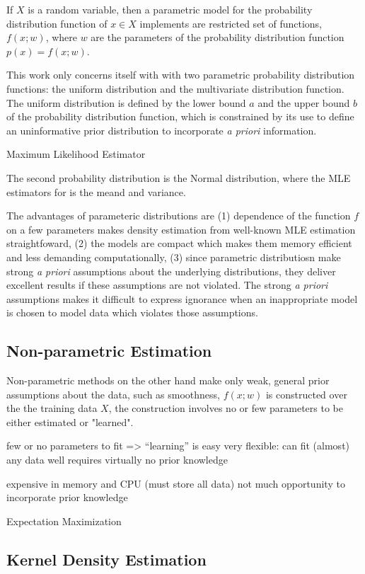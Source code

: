 If $X$ is a random variable, then a parametric model for the probability distribution function of $x \in X$ implements are restricted set of functions, $f(x;w)$, where $w$ are the parameters of the probability distribution function $p(x)=f(x;w)$.

This work only concerns itself with with two parametric probability distribution functions: the uniform distribution and the multivariate distribution function.  The uniform distribution is defined by the lower bound $a$ and the upper bound $b$ of the probability distribution function, which is constrained by its use to define an uninformative prior distribution to incorporate \emph{a priori} information.

Maximum Likelihood Estimator

The second probability distribution is the Normal distribution, where the MLE estimators for is the meand and variance.

The advantages of parameteric distributions are (1) dependence of the function $f$ on a few parameters makes density estimation from well-known MLE estimation straightfoward, (2) the models are compact which makes them memory efficient and less demanding computationally, (3) since parametric distributiosn make strong \emph{a priori} assumptions about the underlying distributions, they deliver excellent results if these assumptions are not violated.  The strong \emph{a priori} assumptions makes it difficult to express ignorance when an inappropriate model is chosen to model data which violates those assumptions.

\subsection{Non-parametric Estimation}
Non-parametric methods on the other hand make only weak, general prior assumptions about the data, such as smoothness, $f(x;w)$ is constructed over the the training data $X$, the construction involves no or few parameters to be either estimated or "learned".

few or no parameters to fit => “learning” is easy
very flexible: can fit (almost) any data well
requires virtually no prior knowledge

expensive in memory and CPU (must store all data)
not much opportunity to incorporate prior knowledge

Expectation Maximization

\subsection{Kernel Density Estimation}

